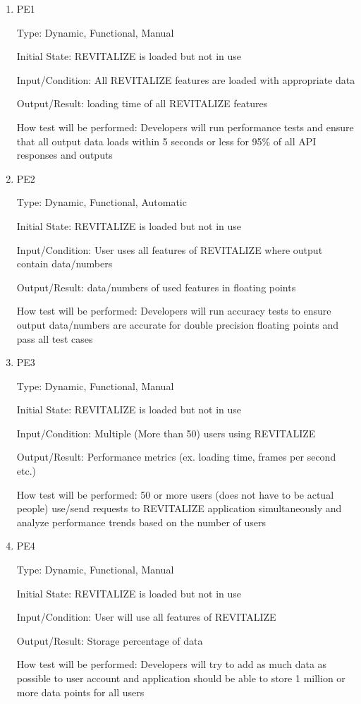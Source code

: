 \documentclass[12pt, titlepage]{article}
\begin{document}
\begin{enumerate}
	
	\item{PE1\\}
	
	Type: Dynamic, Functional, Manual
	
	Initial State: REVITALIZE is loaded but not in use
	
	Input/Condition: All REVITALIZE features are loaded with appropriate data
	
	Output/Result: loading time of all REVITALIZE features
	
	How test will be performed: Developers will run performance tests and ensure that all output data loads within 5 seconds or less for 95\% of all API responses and outputs
	
	\item{PE2\\}
	
	Type: Dynamic, Functional, Automatic
	
	Initial State: REVITALIZE is loaded but not in use
	
	Input/Condition: User uses all features of REVITALIZE where output contain data/numbers
	
	Output/Result: data/numbers of used features in floating points
	
	How test will be performed: Developers will run accuracy tests to ensure output data/numbers are accurate for double precision floating points and pass all test cases
	
	\item{PE3\\}
	
	Type: Dynamic, Functional, Manual
	
	Initial State: REVITALIZE is loaded but not in use
	
	Input/Condition: Multiple (More than 50) users using REVITALIZE
	
	Output/Result: Performance metrics (ex. loading time, frames per second etc.)
	
	How test will be performed: 50 or more users (does not have to be actual people) use/send requests to REVITALIZE application simultaneously and analyze performance trends based on the number of users
	
	\item{PE4\\}
	
	Type: Dynamic, Functional, Manual
	
	Initial State: REVITALIZE is loaded but not in use
	
	Input/Condition: User will use all features of REVITALIZE
	
	Output/Result: Storage percentage of data
	
	How test will be performed: Developers will try to add as much data as possible to user account and application should be able to store 1 million or more data points for all users
	
\end{enumerate}
\end{document}
